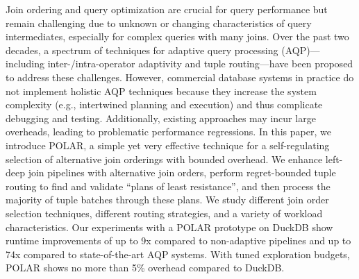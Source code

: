 Join ordering and query optimization are crucial for query performance but remain challenging due to unknown or changing characteristics of query intermediates, especially for complex queries with many joins.
Over the past two decades, a spectrum of techniques for adaptive query processing (AQP)---including inter-/intra-operator adaptivity and tuple routing---have been proposed to address these challenges. However, commercial database systems in practice do not implement holistic AQP techniques because they increase the system complexity (e.g., intertwined planning and execution) and thus complicate debugging and testing. Additionally, existing approaches may incur large overheads, leading to problematic performance regressions.
In this paper, we introduce POLAR, a simple yet very effective technique for a self-regulating selection of alternative join orderings with bounded overhead. We enhance left-deep join pipelines with alternative join orders, perform regret-bounded tuple routing to find and validate \enquote{plans of least resistance}, and then process the majority of tuple batches through these plans. We study different join order selection techniques, different routing strategies, and a variety of workload characteristics.
Our experiments with a POLAR prototype on DuckDB show runtime improvements of up to 9x compared to non-adaptive pipelines and up to 74x compared to state-of-the-art AQP systems. With tuned exploration budgets, POLAR shows no more than 5\% overhead compared to DuckDB. 

